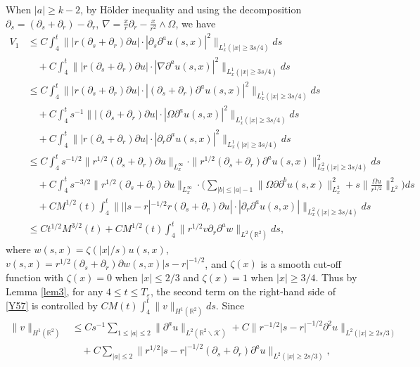 \documentclass[11pt, reqno]{amsart}
\theoremstyle{definition}
\theoremstyle{remark}
\theoremstyle{definition}
\numberwithin{equation}{section}
\numberwithin{equation}{section}
\def\leq{\leqslant}
\def\geq{\geqslant}
\begin{document}
When $|a|\geq k-2$, by H\"{o}lder inequality and using the decomposition $\partial_s=(\partial_s+\partial_r)-\partial_r$, $\nabla=\frac xr\partial_r-\frac 
x{r^2}\wedge\Omega$, we have
\begin{align}\label{Y57}
V_1 &\leq C\int_4^t\||r(\partial_s+\partial_r)\partial u|\cdot|\partial_s\partial^au(s,x)|^2\|_{L_x^1(|x|\geq3s/4)}ds
\nonumber\\&\quad+ C\int_4^t\||r(\partial_s+\partial_r)\partial u|\cdot|\nabla\partial^au(s,x)|^2\|_{L_x^1(|x|\geq3s/4)}ds
\nonumber\\&\leq C\int_4^t\||r(\partial_s+\partial_r)\partial u|\cdot|(\partial_s+\partial_r)\partial^au(s,x)|^2\|_{L_x^1(|x|\geq3s/4)}ds
\nonumber\\&\quad+ C\int_4^ts^{-1}\||(\partial_s+\partial_r)\partial u|\cdot|\Omega\partial^au(s,x)|^2\|_{L_x^1(|x|\geq3s/4)}ds
\nonumber\\&\quad+C\int_4^t\||r(\partial_s+\partial_r)\partial u|\cdot|\partial_r\partial^au(s,x)|^2\|_{L_x^1(|x|\geq3s/4)}ds
\nonumber\\&\leq C\int_4^ts^{-1/2}\|r^{1/2}(\partial_s+\partial_r)\partial 
u\|_{L_x^{\infty}}\cdot\|r^{1/2}(\partial_s+\partial_r)\partial^au(s,x)\|^2_{L_x^2(|x|\geq3s/4)}ds
\nonumber\\&\quad+ C\int_4^ts^{-3/2}\|r^{1/2}(\partial_s+\partial_r)\partial 
u\|_{L_x^{\infty}}\cdot\Big(\sum_{|b|\leq|a|-1}\|\Omega\partial\partial^bu(s,x)\|^2_{L_x^2}+s\Big\|\frac{\Omega u}{r^{1/2}}\Big\|^2_{L^2}\Big)ds
\nonumber\\&\quad+CM^{1/2}(t)\int_4^t\|||s-r|^{-1/2}r(\partial_s+\partial_r)\partial u|\cdot|\partial_r\partial^au(s,x)|\|_{L_x^2(|x|\geq3s/4)}ds
\nonumber\\&\leq Ct^{1/2}M^{3/2}(t)+CM^{1/2}(t)\int_4^t\|r^{1/2}v\partial_r\partial^aw\|_{L^2(\mathbb
R^2)}ds,
\end{align}
where $w(s,x)=\zeta(|x|/s)u(s,x)$,
$v(s,x)=r^{1/2}(\partial_s+\partial_r)\partial w(s,x)|s-r|^{-1/2}$,
and $\zeta(x)$ is a smooth cut-off function with $\zeta(x)=0$ when
$|x|\leq2/3$ and $\zeta(x)=1$ when $|x|\geq3/4$.
Thus by Lemma \ref{lem3}, for any $4\leq t\leq T_{\varepsilon}$, the second term on the right-hand side of \eqref{Y57} is controlled by 
$CM(t)\int_4^t\|v\|_{H^1(\mathbb R^2)}ds$. Since
\begin{align*}
\|v\|_{H^1(\mathbb R^2)}&\leq Cs^{-1}\sum_{1\leq|a|\leq 2}\|\partial^a u\|_{L^2(\mathbb R^2\backslash\mathcal {K})}+C\|r^{-1/2}|s-r|^{-1/2}\partial^2
u\|_{L^2(|x|\geq2s/3)}\nonumber\\&\quad+C\sum_{|a|\leq2}\|r^{1/2}
|s-r|^{-1/2}(\partial_s+\partial_r)\partial^au\|_{L^2(|x|\geq2s/3)},
\end{align*}
\end{document}
